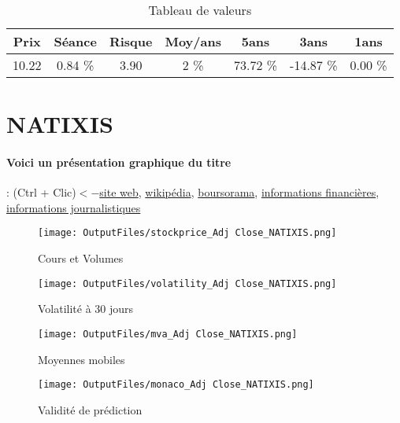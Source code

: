 \documentclass[11pt,a4paper]{report}%
\begin{document}
\begin{table}[H]
  \centering
    \begin{tabular}{|c|c|c|c|c|c|c|}
    \hline
    Prix & Séance & Risque  & Moy/ans & 5ans & 3ans & 1ans \\
    \hline
    10.22 &    0.84 \%    & 3.90 & 2 \% & 73.72 \% & -14.87 \% & 0.00 \% \\
    \hline
    \end{tabular}%
        \label{tab:table_CREDIT AGRICOLE}%
      \caption{Tableau de valeurs}
\end{table}%

\newpage

\section{NATIXIS}

\paragraph{Voici un présentation graphique du titre} : (Ctrl + Clic)$<-$\href{https://www.natixis.com/natixis/jcms/tki_5047/fr/investisseurs-actionnaires}{site web}, \href{https://fr.wikipedia.org/wiki/Natixis}{wikipédia}, \href{https://www.boursorama.com/cours/1rPKN}{boursorama}, \href{https://www.qwant.com/?q=site:https:%2f%2fwww.easybourse.com%2faction-societe%2fNATIXIS&t=web&client=ext-firefox-hp}{informations financières}, \href{https://bourse.lerevenu.com/cours-de-bourse/fiche-valeur-synthese/NATIXIS/KN-FR}{informations journalistiques}
\begin{figure}[!htb]
   \begin{minipage}{0.5\textwidth}
     \centering
     \texttt{[image: OutputFiles/stockprice\_Adj Close\_NATIXIS.png]}
     \caption{Cours et Volumes}\label{Fig:price_NATIXIS}
   \end{minipage}\hfill
   \begin{minipage}{0.5\textwidth}
     \centering
     \texttt{[image: OutputFiles/volatility\_Adj Close\_NATIXIS.png]}
     \caption{Volatilité à 30 jours}\label{Fig:volat_NATIXIS}
   \end{minipage}
\end{figure}
\begin{figure}[!htb]
   \begin{minipage}{0.5\textwidth}
     \centering
     \texttt{[image: OutputFiles/mva\_Adj Close\_NATIXIS.png]}
     \caption{Moyennes mobiles}\label{Fig:mva_NATIXIS}
   \end{minipage}\hfill
   \begin{minipage}{0.5\textwidth}
     \centering
     \texttt{[image: OutputFiles/monaco\_Adj Close\_NATIXIS.png]}
     \caption{Validité de prédiction}\label{Fig:prediction_NATIXIS}
   \end{minipage}
\end{figure}
\end{document}
